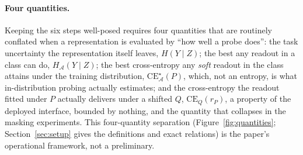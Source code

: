\documentclass[twocolumn,10pt]{article}
\theoremstyle{definition}
\theoremstyle{remark}
\newcommand{\cA}{\mathcal{A}}
\newcommand{\CE}{\mathrm{CE}}
\newcommand{\CEQ}[1]{\CE_{Q}({#1})}
\newcommand{\rP}{r_{P}}
\begin{document}
\paragraph{Four quantities.} Keeping the six steps well-posed requires
four quantities that are routinely conflated when a representation is
evaluated by ``how well a probe does'': the task uncertainty the
representation itself leaves, $H(Y \mid Z)$; the best any readout in
a class can do, $H_{\cA}(Y \mid Z)$; the best cross-entropy any
\emph{soft} readout in the class attains under the training
distribution, $\CE^{\star}_{\cA}(P)$, which, not an entropy, is
what in-distribution probing actually estimates; and the
cross-entropy the readout fitted under $P$ actually delivers under a
shifted $Q$, $\CEQ{\rP}$, a property of the deployed interface,
bounded by nothing, and the quantity that collapses in the masking
experiments. This four-quantity separation
(Figure~\ref{fig:quantities}; Section~\ref{sec:setup} gives the
definitions and exact relations) is the paper's operational
framework, not a preliminary.
\end{document}
